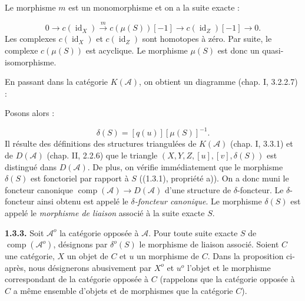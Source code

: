 \clearpage
{}%
\begingroup\small\setlength{\parskip}{0pt}\setlength{\emergencystretch}{1.5em}
\setlength{\abovedisplayskip}{4pt plus 2pt minus 2pt}%
\setlength{\belowdisplayskip}{4pt plus 2pt minus 2pt}%

Le morphisme $m$ est un monomorphisme et on a la suite exacte :

\begin{equation}
0\longrightarrow c(\operatorname{id}_X)
\xrightarrow{m}c(\mu(S))[-1]
\longrightarrow c(\operatorname{id}_Z)[-1]
\longrightarrow0.
\tag{1.3.2.3}
\end{equation}
Les complexes $c(\operatorname{id}_X)$ et $c(\operatorname{id}_Z)$ sont
homotopes à zéro. Par suite, le complexe $c(\mu(S))$ est acyclique. Le
morphisme $\mu(S)$ est donc un quasi-isomorphisme.

En passant dans la catégorie $K(\mathcal A)$, on obtient un diagramme
(chap. I, 3.2.2.7) :
\begin{center}
\end{center}
Posons alors :

\begin{equation}
\delta(S)=[q(u)][\mu(S)]^{-1}.
\tag{1.3.2.4}
\end{equation}
Il résulte des définitions des structures triangulées de $K(\mathcal A)$
(chap. I, 3.3.1) et de $D(\mathcal A)$ (chap. II, 2.2.6) que le triangle
$(X,Y,Z,[u],[v],\delta(S))$ est distingué dans $D(\mathcal A)$. De plus,
on vérifie immédiatement que le morphisme $\delta(S)$ est fonctoriel par
rapport à $S$ ((1.3.1), propriété a)). On a donc muni le foncteur canonique
$\operatorname{comp}(\mathcal A)\longrightarrow D(\mathcal A)$ d'une
structure de $\delta$-foncteur. Le $\delta$-foncteur ainsi obtenu est appelé
le \emph{$\delta$-foncteur canonique}. Le morphisme $\delta(S)$ est appelé
le \emph{morphisme de liaison} associé à la suite exacte $S$.

\medskip\noindent\textbf{1.3.3.}\quad
Soit $\mathcal A^o$ la catégorie opposée à $\mathcal A$. Pour toute suite
exacte $S$ de $\operatorname{comp}(\mathcal A^o)$, désignons par
$\delta^o(S)$ le morphisme de liaison associé. Soient $C$ une catégorie,
$X$ un objet de $C$ et $u$ un morphisme de $C$. Dans la proposition
ci-après, nous désignerons abusivement par $X^o$ et $u^o$ l'objet et le
morphisme correspondant de la catégorie opposée à $C$ (rappelons que la
catégorie opposée à $C$ a même ensemble d'objets et de morphismes que la
catégorie $C$).

